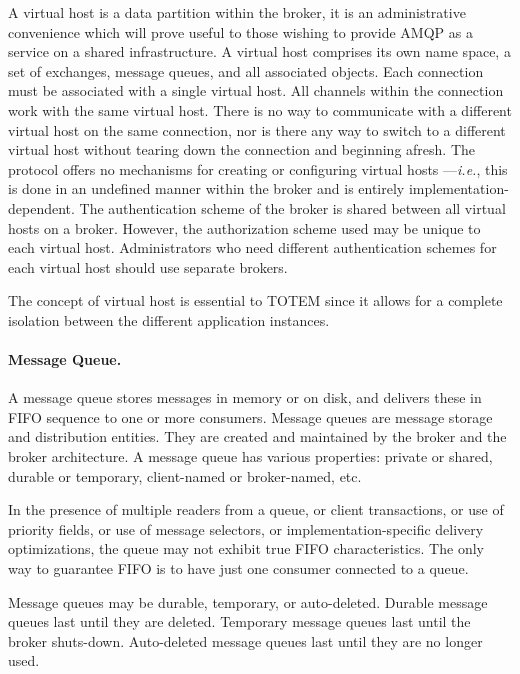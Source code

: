 A virtual host is a data partition within the broker, it is an
administrative convenience which will prove useful to those wishing to
provide AMQP as a service on a shared infrastructure. A virtual host
comprises its own name space, a set of exchanges, message queues, and
all associated objects. Each connection must be associated with a
single virtual host. All channels within the connection work with the
same virtual host. There is no way to communicate with a different
virtual host on the same connection, nor is there any way to switch to
a different virtual host without tearing down the connection and
beginning afresh. The protocol offers no mechanisms for creating or
configuring virtual hosts ---\textit{i.e.}, this is done in an
undefined manner within the broker and is entirely
implementation-dependent. The authentication scheme of the broker is
shared between all virtual hosts on a broker. However, the
authorization scheme used may be unique to each virtual
host. Administrators who need different authentication schemes for
each virtual host should use separate brokers.

The concept of virtual host is essential to TOTEM since it allows for
a complete isolation between the different application instances.

\paragraph{Message Queue.} A message queue stores messages in memory or
on disk, and delivers these in FIFO sequence to one or more
consumers. Message queues are message storage and distribution
entities. They are created and maintained by the broker and the broker
architecture. A message queue has various properties: private or
shared, durable or temporary, client-named or broker-named, etc.

In the presence of multiple readers from a queue, or client
transactions, or use of priority fields, or use of message selectors,
or implementation-specific delivery optimizations, the queue may not
exhibit true FIFO characteristics. The only way to guarantee FIFO is
to have just one consumer connected to a queue.

Message queues may be durable, temporary, or auto-deleted. Durable
message queues last until they are deleted. Temporary message queues
last until the broker shuts-down. Auto-deleted message queues last
until they are no longer used.

